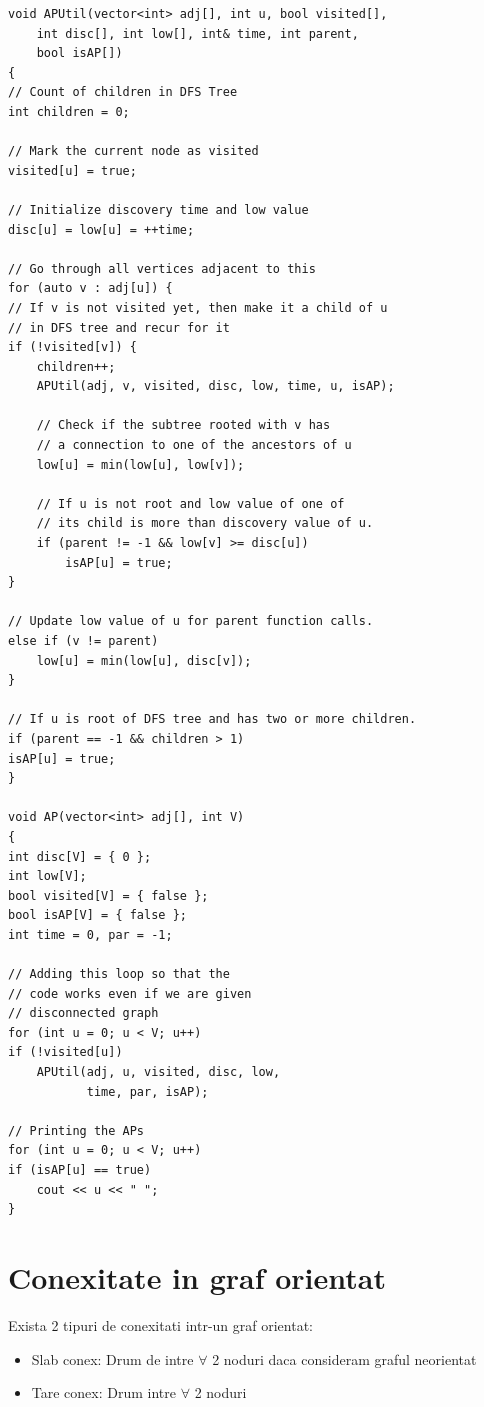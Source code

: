 \documentclass{article}
\begin{document}
\begin{lstlisting}
void APUtil(vector<int> adj[], int u, bool visited[],
    int disc[], int low[], int& time, int parent,
    bool isAP[])
{
// Count of children in DFS Tree
int children = 0;

// Mark the current node as visited
visited[u] = true;

// Initialize discovery time and low value
disc[u] = low[u] = ++time;

// Go through all vertices adjacent to this
for (auto v : adj[u]) {
// If v is not visited yet, then make it a child of u
// in DFS tree and recur for it
if (!visited[v]) {
    children++;
    APUtil(adj, v, visited, disc, low, time, u, isAP);

    // Check if the subtree rooted with v has
    // a connection to one of the ancestors of u
    low[u] = min(low[u], low[v]);

    // If u is not root and low value of one of
    // its child is more than discovery value of u.
    if (parent != -1 && low[v] >= disc[u])
        isAP[u] = true;
}

// Update low value of u for parent function calls.
else if (v != parent)
    low[u] = min(low[u], disc[v]);
}

// If u is root of DFS tree and has two or more children.
if (parent == -1 && children > 1)
isAP[u] = true;
}

void AP(vector<int> adj[], int V)
{
int disc[V] = { 0 };
int low[V];
bool visited[V] = { false };
bool isAP[V] = { false };
int time = 0, par = -1;

// Adding this loop so that the
// code works even if we are given
// disconnected graph
for (int u = 0; u < V; u++)
if (!visited[u])
    APUtil(adj, u, visited, disc, low,
           time, par, isAP);

// Printing the APs
for (int u = 0; u < V; u++)
if (isAP[u] == true)
    cout << u << " ";
}
    \end{lstlisting}

\section{Conexitate in graf orientat} Exista 2 tipuri de conexitati intr-un graf orientat:
\begin{itemize}
    \item Slab conex: Drum de intre $\forall$ 2 noduri daca consideram graful neorientat
    \item Tare conex: Drum intre $\forall$ 2 noduri
\end{itemize}
\end{document}
